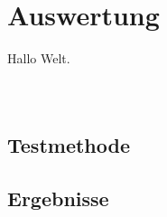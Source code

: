 
\chapter{Auswertung}%
\label{sec:evaluation}

Hallo Welt.

\inputminted{cypher}{data/evaluation/people.cql}
\inputminted{cypher}{data/evaluation/personTimeAction.cql}
\inputminted{cypher}{data/evaluation/personNegationAction.cql}

\section{Testmethode}%
\label{sec:evaluation:methodology}

\section{Ergebnisse}%
\label{sec:evaluation:results}
